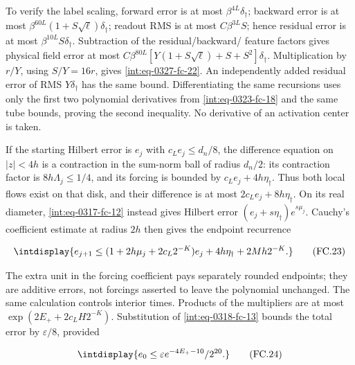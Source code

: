 To verify the label scaling, forward error is at most \(\beta^{4L}\delta_\dagger\); backward error is at most \(\beta^{60L}(1+S\sqrt\ell)\delta_\dagger\); readout RMS is at most \(C\beta^{3L}S\); hence residual error is at most \(\beta^{10L}S\delta_\dagger\). Subtraction of the residual/backward/ feature factors gives physical field error at most \(C\beta^{80L}[Y(1+S\sqrt\ell)+S+S^2]\delta_\dagger\). Multiplication by \(r/Y\), using \(S/Y=16r\), gives \eqref{int:eq-0327-fc-22}. An independently added residual error of RMS \(Y\delta_\dagger\) has the same bound. Differentiating the same recursions uses only the first two polynomial derivatives from \eqref{int:eq-0323-fc-18} and the same tube bounds, proving the second inequality. No derivative of an activation center is taken.



If the starting Hilbert error is \(e_j\) with \(c_Le_j\le d_n/8\), the difference equation on \(|z|<4h\) is a contraction in the sum-norm ball of radius \(d_n/2\): its contraction factor is \(8h\Lambda_j\le1/4\), and its forcing is bounded by \(c_Le_j+4h\eta_\dagger\). Thus both local flows exist on that disk, and their difference is at most \(2c_Le_j+8h\eta_\dagger\). On its real diameter, \eqref{int:eq-0317-fc-12} instead gives Hilbert error \((e_j+s\eta_\dagger)e^{s\mu_j}\). Cauchy's coefficient estimate at radius \(2h\) then gives the endpoint recurrence


\begingroup\renewcommand{\theHequation}{intdisplay.722}
\begin{equation}
\intdisplay{
e_{j+1}\le(1+2h\mu_j+2c_L2^{-K})e_j
+4h\eta_\dagger+2Mh2^{-K}.
}
\tag{FC.23}
\label{int:eq-0328-fc-23}
\end{equation}
\endgroup


The extra unit in the forcing coefficient pays separately rounded endpoints; they are additive errors, not forcings asserted to leave the polynomial unchanged. The same calculation controls interior times. Products of the multipliers are at most \(\exp(2E_++2c_LH2^{-K})\). Substitution of \eqref{int:eq-0318-fc-13} bounds the total error by \(\varepsilon/8\), provided


\begingroup\renewcommand{\theHequation}{intdisplay.723}
\begin{equation}
\intdisplay{
e_0\le\varepsilon e^{-4E_+-10}/2^{20}.
}
\tag{FC.24}
\label{int:eq-0329-fc-24}
\end{equation}
\endgroup

